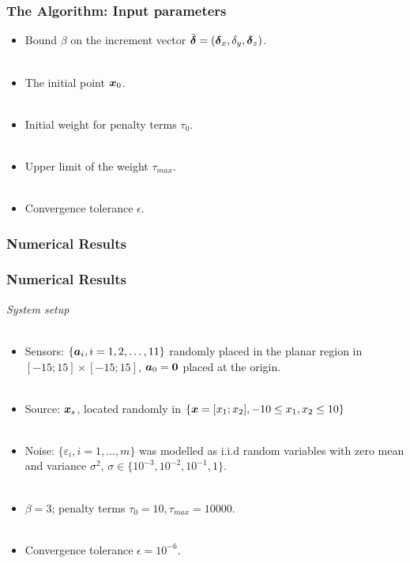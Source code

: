 \documentclass [t] {beamer} %
\begin{document}
\begin{frame} %
\frametitle{The Algorithm: Input parameters}
\phantom{m}
\begin{itemize}
\item
Bound $\beta$ on the increment vector $\tilde{\mbox{\boldmath${\delta}$}} =\left(
\mbox{\boldmath${\delta}$}_x, \delta_y, \mbox{\boldmath${\delta}$}_z\right)$.
\\~\\
\item
The initial point $\mbox{\boldmath$x$}_0$.
\\~\\
\item
Initial weight for penalty terms $\tau_0$.
\\~\\
\item
Upper limit of the weight  $\tau_{max}$.
\\~\\
\item
Convergence tolerance $\epsilon$.
\end{itemize}
\end{frame}



\subsubsection{Numerical Results}

\begin{frame} %
\frametitle{Numerical Results}
{\large \textit{System setup}}
\\~\\
\begin{itemize}
\item
Sensors: $\{\mbox{\boldmath$a$}_i, i = 1, 2,\ldots,11\}$ randomly placed in the planar region in $[-15;15]\times[-15;15]$, $\mbox{\boldmath$a$}_0 = \mbox{\boldmath$0$}$ placed at the origin.
\\~\\
\item
Source: $\mbox{\boldmath$x$}_s$, located randomly in  $\{\mbox{\boldmath$x$}=[x_1;x_2], -10\leq x_1,x_2\leq 10\}$
\\~\\
\item
Noise: $\{\varepsilon_i, i=1,\ldots,m\}$ was modelled as i.i.d random variables with zero mean and variance $\sigma^2$,  $\sigma \in \{10^{-3}, 10^{-2}, 10^{-1}, 1\}$.
\\~\\
\item
$\beta  = 3$; penalty terms $\tau_0 = 10, \tau_{max} = 10 000$.
\\~\\
\item
Convergence tolerance $\epsilon = 10^{-6}$.

\end{itemize}
\end{frame}
\end{document}
